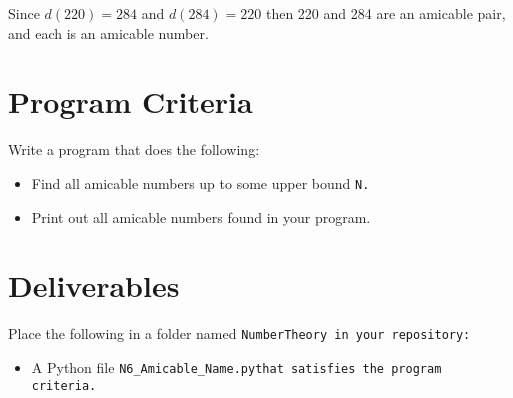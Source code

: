 \documentclass{article}
\def\prog#1{
\vspace{.1in}\begin{mdframed} \begin{center} \textbf{Programming Reminders} \end{center}#1 \end{mdframed} }
\newcommand\foldername{\tt{NumberTheory} }
\newcommand\filename{\tt{N6\_Amicable\_Name.py}\;\;}
\begin{document}
	Since $d(220) = 284$ and $d(284)=220$ then 220 and 284 are an amicable pair, and each is an amicable number.  
 
 	
 	
 	
 	
 	
 	
 	

	
	
	
	
	
	
	
	




\section*{Program Criteria}
	Write a program that does the following:
	\begin{itemize}
		\item Find all amicable numbers up to some upper bound \tt{N}.
		\item Print out all amicable numbers found in your program.
	\end{itemize}







\section*{Deliverables}
	
	
	Place the following in a folder named \foldername in your repository:
	\begin{itemize}
		\item A Python file \filename  that satisfies the program criteria.
	\end{itemize}

	
\end{document}
